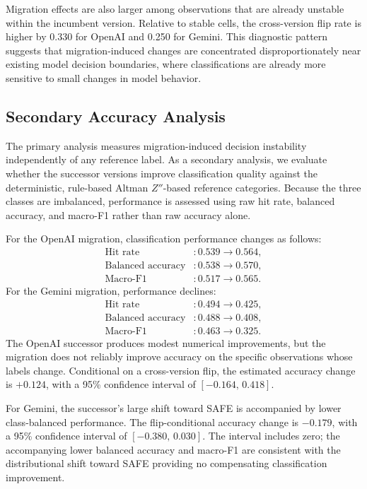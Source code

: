 \documentclass[11pt]{article}
\begin{document}
Migration effects are also larger among observations that are already unstable within the incumbent version. Relative to stable cells, the cross-version flip rate is higher by 0.330 for OpenAI and 0.250 for Gemini. This diagnostic pattern suggests that migration-induced changes are concentrated disproportionately near existing model decision boundaries, where classifications are already more sensitive to small changes in model behavior.

\subsection{Secondary Accuracy Analysis}
\label{sec:acc}
The primary analysis measures migration-induced decision instability independently of any reference label. As a secondary analysis, we evaluate whether the successor versions improve classification quality against the deterministic, rule-based Altman $Z''$-based reference categories. Because the three classes are imbalanced, performance is assessed using raw hit rate, balanced accuracy, and macro-F1 rather than raw accuracy alone.

For the OpenAI migration, classification performance changes as follows:
\begin{equation}
\begin{aligned}
\text{Hit rate} &: 0.539 \rightarrow 0.564,\\
\text{Balanced accuracy} &: 0.538 \rightarrow 0.570,\\
\text{Macro-F1} &: 0.517 \rightarrow 0.565.
\end{aligned}
\end{equation}
For the Gemini migration, performance declines:
\begin{equation}
\begin{aligned}
\text{Hit rate} &: 0.494 \rightarrow 0.425,\\
\text{Balanced accuracy} &: 0.488 \rightarrow 0.408,\\
\text{Macro-F1} &: 0.463 \rightarrow 0.325.
\end{aligned}
\end{equation}
The OpenAI successor produces modest numerical improvements, but the migration does not reliably improve accuracy on the specific observations whose labels change. Conditional on a cross-version flip, the estimated accuracy change is $+0.124$, with a 95\% confidence interval of $[-0.164,\,0.418]$.

For Gemini, the successor's large shift toward SAFE is accompanied by lower class-balanced performance. The flip-conditional accuracy change is $-0.179$, with a 95\% confidence interval of $[-0.380,\,0.030]$. The interval includes zero; the accompanying lower balanced accuracy and macro-F1 are consistent with the distributional shift toward SAFE providing no compensating classification improvement.
\end{document}
